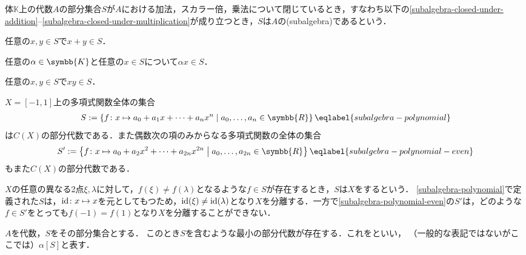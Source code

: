 \documentclass[../main.tex]{subfiles}
\begin{document}
\begin{thmbox}
\begin{definition}[（部分代数）]
体\(\mathbb{K}\)上の代数\(A\)の部分集合\(S\)が\(A\)における加法，スカラー倍，乗法について閉じているとき，すなわち以下の\ref{subalgebra-closed-under-addition}--\ref{subalgebra-closed-under-multiplication}が成り立つとき，\(S\)は\(A\)の(subalgebra)であるという．
\begin{conditions}
    \item\label{subalgebra-closed-under-addition} 任意の\(x, y \in S\)で\(x + y \in S\)．
    \item 任意の\(\alpha \in \symbb{K}\)と任意の\(x \in S\)について\(\alpha x \in S\)．
    \item\label{subalgebra-closed-under-multiplication} 任意の\(x, y \in S\)で\(xy \in S\)．
\end{conditions}
\end{definition}
\end{thmbox}

\begin{example} \(X = [-1, 1]\)上の多項式関数全体の集合
\begin{align}
    S := \left\{f\colon x \mapsto a_0 + a_1 x + \cdots + a_{n} x^{n} \; \middle| \; a_{0}, \ldots, a_{n} \in \symbb{R} \right\}
    \eqlabel{subalgebra-polynomial}
\end{align}
は\(C(X)\)の部分代数である．また偶数次の項のみからなる多項式関数の全体の集合
\begin{align}
    S' := \left\{f\colon x \mapsto a_0 + a_2 x^2 + \cdots + a_{2n} x^{2n} \; \middle| \; a_{0}, \ldots, a_{2n} \in \symbb{R} \right\}
    \eqlabel{subalgebra-polynomial-even}
\end{align}
もまた\(C(X)\)の部分代数である．
\end{example}

\(X\)の任意の異なる2点\(\xi, \lambda\)に対して，\(f(\xi) \neq f(\lambda)\)となるような\(f \in S\)が存在するとき，\(S\)は\(X\)をするという．
\eqref{subalgebra-polynomial}で定義された\(S\)は，\(\operatorname{id}\colon x \mapsto x\)を元としてもつため，\(\operatorname{id}(\xi) \neq \operatorname{id}(\lambda)\)となり\(X\)を分離する．一方で\eqref{subalgebra-polynomial-even}の\(S'\)は，どのような\(f\in S'\)をとっても\(f(-1) =  f(1)\)となり\(X\)を分離することができない．

\begin{thmbox}
\begin{definition}[生成される部分代数] \(A\)を代数，\(S\)をその部分集合とする．
このとき\(S\)を含むような最小の部分代数が存在する．これをといい，
（一般的な表記ではないがここでは）\(\alpha[S]\)と表す．
\end{definition}
\end{thmbox}
\end{document}
